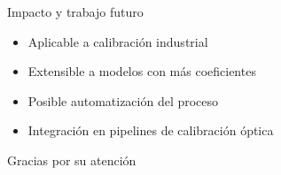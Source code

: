 \documentclass[aspectratio=169]{beamer}
\begin{document}
\begin{frame}{Impacto y trabajo futuro}
\begin{itemize}
    \item Aplicable a calibración industrial
    \item Extensible a modelos con más coeficientes
    \item Posible automatización del proceso
    \item Integración en pipelines de calibración óptica
\end{itemize}
\end{frame}

\begin{frame}
\centering
\Huge{Gracias por su atención}
\end{frame}
\end{document}
